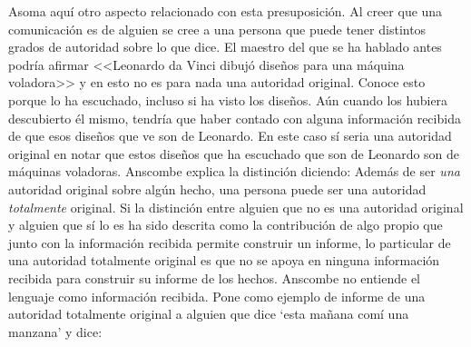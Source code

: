 Asoma aquí otro aspecto relacionado con esta presuposición. Al creer que una comunicación es de alguien se cree a una persona que puede tener distintos grados de autoridad sobre lo que dice. El maestro del que se ha hablado antes podría afirmar <<Leonardo da Vinci dibujó diseños para una máquina voladora>> y en esto no es para nada una autoridad original\autocite[Cf.~][6]{anscombe2008faith:tobelieve}. Conoce esto porque lo ha escuchado, incluso si ha visto los diseños. Aún cuando los hubiera descubierto él mismo, tendría que haber contado con alguna información recibida de que esos diseños que ve son de Leonardo. En este caso sí seria una autoridad original en notar que estos diseños que ha escuchado que son de Leonardo son de máquinas voladoras. Anscombe explica la distinción diciendo:  Además de ser \emph{una} autoridad original sobre algún hecho, una persona puede ser una autoridad \emph{totalmente} original. Si la distinción entre alguien que no es una autoridad original y alguien que sí lo es ha sido descrita como la contribución de algo propio que junto con la información recibida permite construir un informe, lo particular de una autoridad totalmente original es que no se apoya en ninguna información recibida para construir su informe de los hechos. Anscombe no entiende el lenguaje como información recibida. Pone como ejemplo de informe de una autoridad totalmente original a alguien que dice `esta mañana comí una manzana' y dice: 

